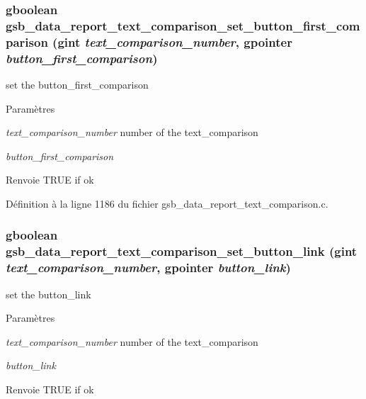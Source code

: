 \subsubsection[{gsb\_\-data\_\-report\_\-text\_\-comparison\_\-set\_\-button\_\-first\_\-comparison}]{\setlength{\rightskip}{0pt plus 5cm}gboolean gsb\_\-data\_\-report\_\-text\_\-comparison\_\-set\_\-button\_\-first\_\-comparison (gint {\em text\_\-comparison\_\-number}, \/  gpointer {\em button\_\-first\_\-comparison})}\label{gsb__data__report__text__comparison_8h_ae906258924ec87f65f82274c9cd98681}
set the button\_\-first\_\-comparison


\begin{DoxyParams}{Paramètres}
\item[{\em text\_\-comparison\_\-number}]number of the text\_\-comparison \item[{\em button\_\-first\_\-comparison}]\end{DoxyParams}
\begin{DoxyReturn}{Renvoie}
TRUE if ok 
\end{DoxyReturn}


Définition à la ligne 1186 du fichier gsb\_\-data\_\-report\_\-text\_\-comparison.c.

\subsubsection[{gsb\_\-data\_\-report\_\-text\_\-comparison\_\-set\_\-button\_\-link}]{\setlength{\rightskip}{0pt plus 5cm}gboolean gsb\_\-data\_\-report\_\-text\_\-comparison\_\-set\_\-button\_\-link (gint {\em text\_\-comparison\_\-number}, \/  gpointer {\em button\_\-link})}\label{gsb__data__report__text__comparison_8h_a8a3e2ddf2fb6acb0f2bb18df643f9d88}
set the button\_\-link


\begin{DoxyParams}{Paramètres}
\item[{\em text\_\-comparison\_\-number}]number of the text\_\-comparison \item[{\em button\_\-link}]\end{DoxyParams}
\begin{DoxyReturn}{Renvoie}
TRUE if ok 
\end{DoxyReturn}


